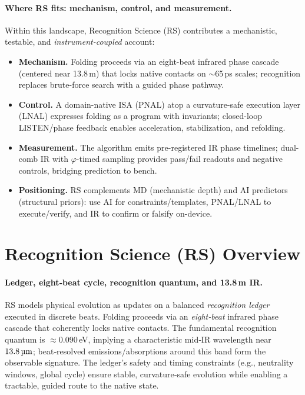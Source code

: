 \documentclass[12pt,a4paper]{article}
\begin{document}
\paragraph{Where RS fits: mechanism, control, and measurement.}
Within this landscape, Recognition Science (RS) contributes a mechanistic, testable, and \emph{instrument-coupled} account:
\begin{itemize}
  \item \textbf{Mechanism.} Folding proceeds via an eight-beat infrared phase cascade (centered near 13.8\,\textmu m) that locks native contacts on $\sim$65\,ps scales; recognition replaces brute-force search with a guided phase pathway.
  \item \textbf{Control.} A domain-native ISA (PNAL) atop a curvature-safe execution layer (LNAL) expresses folding as a program with invariants; closed-loop LISTEN/phase feedback enables acceleration, stabilization, and refolding.
  \item \textbf{Measurement.} The algorithm emits pre-registered IR phase timelines; dual-comb IR with $\varphi$-timed sampling provides pass/fail readouts and negative controls, bridging prediction to bench.
  \item \textbf{Positioning.} RS complements MD (mechanistic depth) and AI predictors (structural priors): use AI for constraints/templates, PNAL/LNAL to execute/verify, and IR to confirm or falsify on-device.
\end{itemize}

\section{Recognition Science (RS) Overview}

\paragraph{Ledger, eight‑beat cycle, recognition quantum, and 13.8\,\textmu m IR.}
RS models physical evolution as updates on a balanced \emph{recognition ledger} executed in discrete beats. Folding proceeds via an \emph{eight‑beat} infrared phase cascade that coherently locks native contacts. The fundamental recognition quantum is $\approx 0.090$\,eV, implying a characteristic mid‑IR wavelength near $13.8\,\text{\textmu m}$; beat‑resolved emissions/absorptions around this band form the observable signature. The ledger's safety and timing constraints (e.g., neutrality windows, global cycle) ensure stable, curvature‑safe evolution while enabling a tractable, guided route to the native state.
\end{document}
